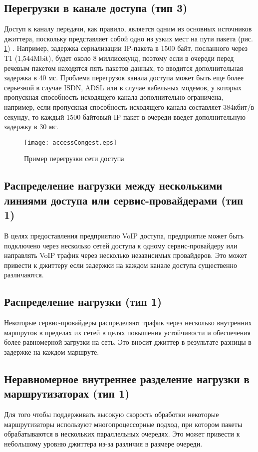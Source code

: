 \subsection{Перегрузки в канале доступа (тип 3) } \label{subsect2_1_3}
Доступ к каналу передачи, как правило, является одним из основных источников джиттера, поскольку представляет собой одно из узких мест на пути пакета (рис. \ref{img:accessCongest}) \cite{clark}. 
Например, задержка сериализации IP-пакета в 1500 байт, посланного через T1 (1,544Mbit), будет около 8 миллисекунд, поэтому если в очереди перед речевым пакетом находятся пять пакетов данных, 
то вводится дополнительная задержка в 40 мс. 
Проблема перегрузок канала доступа может быть еще более серьезной в случае ISDN, ADSL или в случае кабельных модемов, 
у которых пропускная способность исходящего канала дополнительно ограничена, например, если пропускная способность исходящего канала составляет 384кбит/в секунду, 
то каждый 1500 байтовый IP пакет в очереди введет дополнительную задержку в 30 мс.

\begin{figure} [!h]
  \center
\texttt{[image: accessCongest.eps]}
  \caption{Пример перегрузки сети доступа}
  \label{img:accessCongest}
\end{figure}

\subsection{Распределение нагрузки между несколькими линиями доступа или сервис-провайдерами (тип 1) } \label{subsect2_1_4}
В целях предоставления предприятию VoIP доступа, предприятие может быть подключено через несколько сетей доступа к одному сервис-провайдеру или направлять VoIP трафик через несколько независимых провайдеров. Это может привести к джиттеру если задержки на каждом канале доступа существенно различаются.

\subsection{Распределение нагрузки (тип 1) } \label{subsect2_1_5}
Некоторые сервис-провайдеры распределяют трафик через несколько внутренних маршрутов в пределах их сетей в целях повышения устойчивости и обеспечения более равномерной загрузки на сеть. Это вносит джиттер в результате разницы в задержке на каждом маршруте.

\subsection{Неравномерное внутреннее разделение нагрузки в маршрутизаторах (тип 1) } \label{subsect2_1_6}
Для того чтобы поддерживать высокую скорость обработки некоторые маршрутизаторы используют многопроцессорные подход, при котором пакеты обрабатываются в нескольких параллельных очередях. Это может привести к небольшому уровню джиттера из-за различия в размере очереди.

